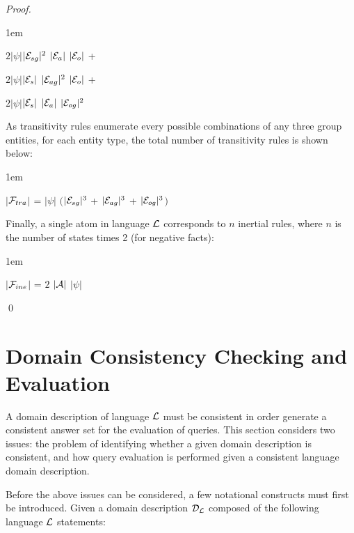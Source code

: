 \documentclass[global,twocolumn,final]{svjour}
\newenvironment{vproof}
  {\begin{proof}\hspace{0.25em}}
  {\qed\end{proof}}
\newenvironment{vquote}
  {\begin{list}{}{\leftmargin 1em}\item[]}
  {\end{list}}
\begin{document}
\begin{vproof}
\begin{vquote}
            \hspace{1em}
            $2|\psi|$$|{\cal E}_{sg}|^{2}$ $|{\cal E}_{a}|$ $|{\cal E}_{o}|$ +

            \hspace{1em}
            $2|\psi|$$|{\cal E}_{s}|$ $|{\cal E}_{ag}|^{2}$ $|{\cal E}_{o}|$ +

            \hspace{1em}
            $2|\psi|$$|{\cal E}_{s}|$ $|{\cal E}_{a}|$ $|{\cal E}_{og}|^{2}$
          \end{vquote}

          As transitivity rules enumerate every possible combinations of any
          three group entities, for each entity type, the total number of
          transitivity rules is shown below:

          \begin{vquote}
            $|$${\cal F}_{tra}$$|$ =
            $|\psi|$ $($$|{\cal E}_{sg}|^{3}$ +
            $|{\cal E}_{ag}|^{3}$ +
            $|{\cal E}_{og}|^{3}$$)$
          \end{vquote}

          Finally, a single atom in language ${\cal L}$ corresponds to $n$
          inertial rules, where $n$ is the number of states times 2 (for
          negative facts):

          \begin{vquote}
            $|$${\cal F}_{ine}$$|$ =
            $2$ $|{\cal A}|$ $|\psi|$
          \end{vquote}
        \end{vproof}

  \section{Domain Consistency Checking and Evaluation}
    \label{sec-cons}

    A domain description of language ${\cal L}$ must be consistent in order
    generate a consistent answer set for the evaluation of queries. This
    section considers two issues: the problem of identifying whether a given
    domain description is consistent, and how query evaluation is performed
    given a consistent language domain description.

    Before the above issues can be considered, a few notational constructs
    must first be introduced. Given a domain description ${\cal D_{L}}$
    composed of the following language ${\cal L}$ statements:
\end{document}
